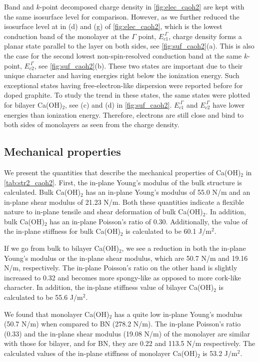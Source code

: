 Band and $k$-point decomposed charge density in \autoref{fig:elec_caoh2} are 
kept with the same isosurface level for comparison. However, as we further 
reduced the isosurface level at  in (d) and (g) of \autoref{fig:elec_caoh2}, which is the lowest conduction band of the 
monolayer at the $\Gamma$ point, $E_{c1}^{~\Gamma}$, charge density forms a planar 
state parallel to the layer on both sides, see \autoref{fig:suf_caoh2}(a). This
is also the case for the second lowest non-spin-resolved conduction band at the same
$k$-point, $E_{c2}^{~\Gamma}$, see \autoref{fig:suf_caoh2}(b). These two states are 
important due to their unique character and having energies right below the ionization energy. Such exceptional states 
having free-electron-like dispersion were reported before\cite{Posternak1,Posternak2} for 
doped graphite. To study the trend in these states, the same states were plotted 
for bilayer Ca(OH)$_2$, see (c) and (d) in \autoref{fig:suf_caoh2}. $E_{c1}^{~\Gamma}$ and $E_{c2}^{~\Gamma}$ have lower energies than ionization energy. Therefore, electrons are still close and bind to both sides of monolayers as seen from the charge density. 

\subsection{Mechanical properties}

We present the quantities that describe the mechanical 
properties of Ca(OH)$_2$ in \autoref{tab:str2_caoh2}. 
First, the in-plane Young's modulus of the bulk structure is calculated. 
Bulk Ca(OH)$_2$ has an in-plane Young's modulus of 55.0 N/m and an in-plane shear 
modulus of 21.23 N/m. Both these quantities indicate a flexible nature to in-plane 
tensile and shear deformation of bulk Ca(OH)$_2$. In addition, bulk Ca(OH)$_2$ has 
an in-plane Poisson's ratio of 0.30.  Additionally, the value of the in-plane 
stiffness for bulk Ca(OH)$_{2}$ is calculated to be 60.1 J/m$^{2}$. 

If we go from bulk to bilayer Ca(OH)$_2$, we see a reduction in both the
in-plane Young's modulus or the in-plane shear modulus, which are 50.7 N/m and 
19.16 N/m, respectively. The in-plane Poisson's ratio on the other hand is 
slightly increased to 0.32 and becomes more spongy-like as opposed to more 
cork-like character\cite{poisson}. In addition, the in-plane stiffness value of 
bilayer Ca(OH)$_{2}$ is calculated to be 55.6 J$/$m$^{2}$. 

We found that monolayer Ca(OH)$_2$ has a quite low in-plane Young's modulus 
(50.7 N/m) when compared to BN (278.2 N/m). The in-plane Poisson's ratio (0.33) 
and the in-plane shear modulus (19.08 N/m) of the monolayer are similar with 
those for bilayer, and for BN, they are 0.22 and 113.5 N/m respectively. The 
calculated values of the in-plane stiffness of monolayer Ca(OH)$_{2}$ is 53.2 
J$/$m$^{2}$. 

